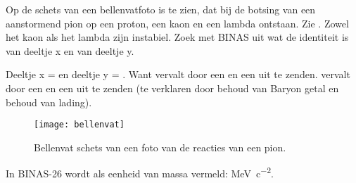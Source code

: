 \begin{questions}

\question
Op de schets van een bellenvatfoto is te zien, dat bij de botsing van een
aanstormend pion op een proton, een kaon en een lambda ontstaan. Zie
.
Zowel het kaon als het lambda zijn instabiel.
Zoek met BINAS uit wat de identiteit is van deeltje x en van deeltje y.
\begin{solution}
    Deeltje x = \Ppiplus en deeltje y = \Pp.  Want \PKzero vervalt door
    een \Ppiplus en een \Ppiminus uit te zenden. \PLambda vervalt door een
    \Ppiminus en een \Pp uit te zenden (te verklaren door behoud van
    Baryon getal en behoud van lading).
\end{solution}

\begin{figure}[h]
    \centering
    \texttt{[image: bellenvat]}
    \caption{Bellenvat schets van een foto van de reacties van een pion.}
    \label{fig:bellenvat}
\end{figure}


\question
In BINAS-26 wordt als eenheid van massa vermeld: \si{MeV.c^{-2}}.
\end{questions}
